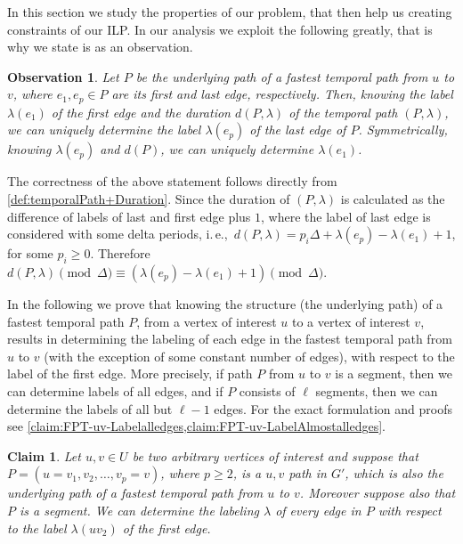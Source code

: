 \documentclass[11pt,a4paper]{article}
\newtheorem{observation}{Observation}
\newtheorem{claim}[theorem]{Claim}
\theoremstyle{remark}
\theoremstyle{definition}
\newcommand{\ie}{i.\,e.,\ }
\begin{document}
In this section we study the properties of our problem, that then help us creating constraints of our ILP.
In our analysis we exploit the following greatly, that is why we state is as an observation.

\begin{observation}\label{obs:FirstLabelAndDuration}
    Let $P$ be the underlying path of a fastest temporal path from $u$ to $v$, where $e_1, e_p \in P$ are its first and last edge, respectively.
    Then, knowing the label $\lambda (e_1)$ of the first edge and the duration $d(P,\lambda)$ of the temporal path $(P,\lambda)$, we can uniquely determine the label $\lambda (e_p)$ of the last edge of $P$.
    Symmetrically, knowing $\lambda(e_p)$ and $d(P)$, we can uniquely determine $\lambda(e_1)$.
\end{observation}
The correctness of the above statement follows directly from \cref{def:temporalPath+Duration}. Since the duration of $(P,\lambda)$ is calculated as the difference of labels of last and first edge plus $1$,
where the label of last edge is considered with some delta periods,
\ie $d(P,\lambda) = p_i \Delta + \lambda(e_p) - \lambda (e_1) + 1$, for some $p_i \geq 0$.
Therefore $d(P,\lambda) \pmod \Delta \equiv  (\lambda(e_p) - \lambda (e_1) + 1) \pmod \Delta$.

In the following we prove that knowing the structure (the underlying path) of a fastest temporal path $P$, from a vertex of interest $u$ to a vertex of interest $v$,
results in determining the labeling of each edge in the fastest temporal path from $u$ to $v$ 
(with the exception of some constant number of edges), with respect to the label of the first edge.
More precisely, if path $P$ from $u$ to $v$ is a segment, then we can determine labels of all edges,
and if $P$ consists of $\ell$ segments, then we can determine the labels of all but $\ell -1$ edges.
For the exact formulation and proofs see \cref{claim:FPT-uv-Labelalledges,claim:FPT-uv-LabelAlmostalledges}.

\begin{claim}\label{claim:FPT-uv-Labelalledges}
    Let $u, v \in U$ be two arbitrary vertices of interest and suppose that $P = (u=v_1,v_2, \dots, v_p = v)$, where $p \geq 2$, 
    is a $u,v$ path in $G'$, which is also the underlying path of a fastest temporal path from $u$ to $v$.
    Moreover suppose also that $P$ is a segment.
    We can determine the labeling $\lambda$ of every edge in $P$ with respect to the label $\lambda(uv_2)$ of the first edge.
\end{claim}
\end{document}

